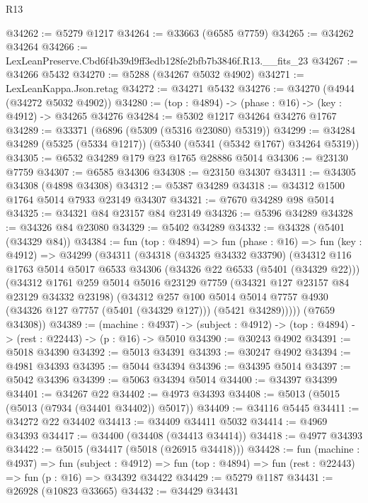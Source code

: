 \begin{lexlean}{R13}
\begin{coremodule}
@34262 := @5279 @1217
@34264 := @33663 (@6585 @7759)
@34265 := @34262 @34264
@34266 := LexLeanPreserve.Cbd6f4b39d9ff3edb128fe2bfb7b3846f.R13.__fits_23
@34267 := @34266 @5432
@34270 := @5288 (@34267 @5032 @4902)
@34271 := LexLeanKappa.Json.retag
@34272 := @34271 @5432
@34276 := @34270 (@4944 (@34272 @5032 @4902))
@34280 := (top : @4894) -> (phase : @16) -> (key : @4912) -> @34265 @34276
@34284 := @5302 @1217 @34264 @34276 @1767
@34289 := @33371 (@6896 (@5309 (@5316 @23080) @5319))
@34299 := @34284 @34289 (@5325 (@5334 @1217)) (@5340 (@5341 (@5342 @1767) @34264 @5319))
@34305 := @6532 @34289 @179 @23 @1765 @28886 @5014
@34306 := @23130 @7759
@34307 := @6585 @34306
@34308 := @23150 @34307
@34311 := @34305 @34308 (@4898 @34308)
@34312 := @5387 @34289
@34318 := @34312 @1500 @1764 @5014 @7933 @23149 @34307
@34321 := @7670 @34289 @98 @5014
@34325 := @34321 @84 @23157 @84 @23149
@34326 := @5396 @34289
@34328 := @34326 @84 @23080
@34329 := @5402 @34289
@34332 := @34328 (@5401 (@34329 @84))
@34384 := fun (top : @4894) =>
  fun (phase : @16) =>
  fun (key : @4912) =>
  @34299
    (@34311
      (@34318
        (@34325 @34332 @33790)
        (@34312
          @116
          @1763
          @5014
          @5017
          @6533
          @34306
          (@34326 @22 @6533 (@5401 (@34329 @22)))
          (@34312
            @1761
            @259
            @5014
            @5016
            @23129
            @7759
            (@34321 @127 @23157 @84 @23129 @34332 @23198)
            (@34312
              @257
              @100
              @5014
              @5014
              @7757
              @4930
              (@34326 @127 @7757 (@5401 (@34329 @127)))
              (@5421 @34289)))))
      (@7659 @34308))
@34389 := (machine : @4937) ->
  (subject : @4912) -> (top : @4894) -> (rest : @22443) -> (p : @16) -> @5010
@34390 := @30243 @4902
@34391 := @5018 @34390
@34392 := @5013 @34391
@34393 := @30247 @4902
@34394 := @4981 @34393
@34395 := @5044 @34394
@34396 := @34395 @5014
@34397 := @5042 @34396
@34399 := @5063 @34394 @5014
@34400 := @34397 @34399
@34401 := @34267 @22
@34402 := @4973 @34393
@34408 := @5013 (@5015 (@5013 (@7934 (@34401 @34402)) @5017))
@34409 := @34116 @5445
@34411 := @34272 @22 @34402
@34413 := @34409 @34411 @5032
@34414 := @4969 @34393
@34417 := @34400 (@34408 (@34413 @34414))
@34418 := @4977 @34393
@34422 := @5015 (@34417 (@5018 (@26915 @34418)))
@34428 := fun (machine : @4937) =>
  fun (subject : @4912) =>
  fun (top : @4894) => fun (rest : @22443) => fun (p : @16) => @34392 @34422
@34429 := @5279 @1187
@34431 := @26928 (@10823 @33665)
@34432 := @34429 @34431

\end{coremodule}
\end{lexlean}
